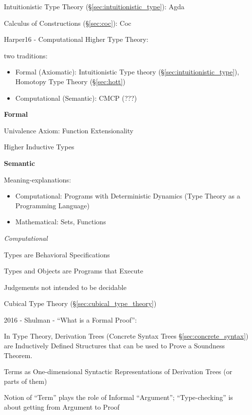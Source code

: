 \asterism


Intuitionistic Type Theory (\S\ref{sec:intuitionistic_type}): Agda

Calculus of Constructions (\S\ref{sec:coc}): Coc


\asterism

Harper16 - Computational Higher Type Theory:

two traditions:

\begin{itemize}
  \item Formal (Axiomatic): Intuitionistic Type theory
    (\S\ref{sec:intuitionistic_type}), Homotopy Type Theory
    (\S\ref{sec:hott})
  \item Computational (Semantic): CMCP (???) %
\end{itemize}


\textbf{Formal}

Univalence Axiom: Function Extensionality

Higher Inductive Types


\textbf{Semantic}

Meaning-explanations:
\begin{itemize}
  \item Computational: Programs with Deterministic Dynamics (Type
    Theory as a Programming Language)
  \item Mathematical: Sets, Functions
\end{itemize}

\emph{Computational}

Types are Behavioral Specifications

Types and Objects are Programs that Execute

Judgements not intended to be decidable

Cubical Type Theory (\S\ref{sec:cubical_type_theory})


\asterism


2016 - Shulman - ``What is a Formal Proof'': %

In Type Theory, Derivation Trees (Concrete Syntax Trees
\S\ref{sec:concrete_syntax}) are Inductively Defined Structures that
can be used to Prove a Soundness Theorem.

Terms as One-dimensional Syntactic Representations of Derivation Trees
(or parts of them)

Notion of ``Term'' plays the role of Informal ``Argument'';
``Type-checking'' is about getting from Argument to Proof

